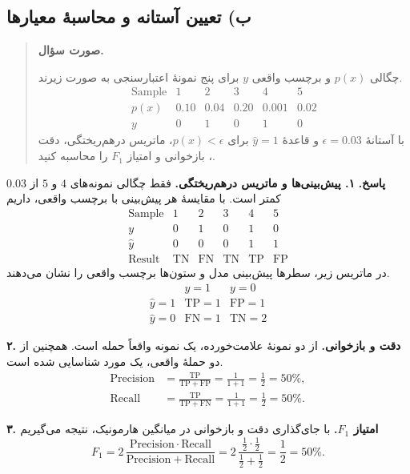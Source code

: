 \documentclass{article}
\numberwithin{equation}{section}
\numberwithin{table}{section}
\newenvironment{questionprompt}{%
    \begin{quote}\noindent\textbf{صورت سؤال.}\enspace\ignorespaces
}{%
    \end{quote}\noindent\textbf{پاسخ.}\enspace\ignorespacesafterend
}
\begin{document}
\subsection*{ب) تعیین آستانه و محاسبهٔ معیارها}
\begin{questionprompt}
    چگالی \(p(x)\) و برچسب واقعی \(y\) برای پنج نمونهٔ اعتبارسنجی به صورت زیرند.
    \[
        \begin{array}{c|ccccc}
            \text{Sample} & 1 & 2 & 3 & 4 & 5\\ \hline
            p(x) & 0.10 & 0.04 & 0.20 & 0.001 & 0.02\\
            y    & 0    & 1    & 0    & 1     & 0
        \end{array}
    \]
    با آستانهٔ \(\epsilon=0.03\) و قاعدهٔ \(\hat{y}=1\) برای \(p(x)<\epsilon\)، ماتریس درهم‌ریختگی، دقت ، بازخوانی  و امتیاز \(F_1\) را محاسبه کنید.
\end{questionprompt}
\textbf{۱. پیش‌بینی‌ها و ماتریس درهم‌ریختگی.}
فقط چگالی نمونه‌های \(4\) و \(5\) از \(0.03\) کمتر است. با مقایسهٔ هر پیش‌بینی با برچسب واقعی، داریم
\[
    \begin{array}{c|ccccc}
        \text{Sample} & 1 & 2 & 3 & 4 & 5\\ \hline
        y             & 0 & 1 & 0 & 1 & 0\\
        \hat{y}       & 0 & 0 & 0 & 1 & 1\\
        \text{Result} & \mathrm{TN} & \mathrm{FN} & \mathrm{TN} &
                         \mathrm{TP} & \mathrm{FP}
    \end{array}
\]
در ماتریس زیر، سطرها پیش‌بینی مدل و ستون‌ها برچسب واقعی را نشان می‌دهند.
\[
    \begin{array}{c|cc}
        & y=1 & y=0\\ \hline
        \hat{y}=1 & \mathrm{TP}=1 & \mathrm{FP}=1\\
        \hat{y}=0 & \mathrm{FN}=1 & \mathrm{TN}=2
    \end{array}
\]

\noindent\textbf{۲. دقت و بازخوانی.}
از دو نمونهٔ علامت‌خورده، یک نمونه واقعاً حمله است. همچنین از دو حملهٔ واقعی، یک مورد شناسایی شده است.
\begin{align*}
    \mathrm{Precision}
    &=\frac{\mathrm{TP}}{\mathrm{TP}+\mathrm{FP}}
      =\frac{1}{1+1}=\frac12=50\%,\\
    \mathrm{Recall}
    &=\frac{\mathrm{TP}}{\mathrm{TP}+\mathrm{FN}}
      =\frac{1}{1+1}=\frac12=50\%.
\end{align*}

\noindent\textbf{۳. امتیاز \(F_1\).}
با جای‌گذاری دقت و بازخوانی در میانگین هارمونیک، نتیجه می‌گیریم
\[
    F_1=2\,\frac{\mathrm{Precision}\cdot\mathrm{Recall}}
                     {\mathrm{Precision}+\mathrm{Recall}}
       =2\,\frac{\frac12\cdot\frac12}{\frac12+\frac12}
       =\frac12=50\%.
\]
\end{document}
